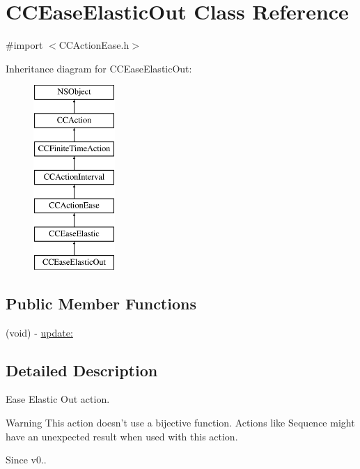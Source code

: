\hypertarget{interface_c_c_ease_elastic_out}{\section{C\-C\-Ease\-Elastic\-Out Class Reference}
\label{interface_c_c_ease_elastic_out}
}


{\ttfamily \#import $<$C\-C\-Action\-Ease.\-h$>$}

Inheritance diagram for C\-C\-Ease\-Elastic\-Out\-:\begin{figure}[H]
\begin{center}
\leavevmode
\includegraphics[height=7.000000cm]{interface_c_c_ease_elastic_out}
\end{center}
\end{figure}
\subsection*{Public Member Functions}
\begin{DoxyCompactItemize}
\item 
(void) -\/ \hyperlink{interface_c_c_ease_elastic_out_a069b3fce533cd8ef4cfd5e7be3e805cb}{update\-:}
\end{DoxyCompactItemize}


\subsection{Detailed Description}
Ease Elastic Out action. \begin{DoxyWarning}{Warning}
This action doesn't use a bijective function. Actions like Sequence might have an unexpected result when used with this action. 
\end{DoxyWarning}
\begin{DoxySince}{Since}
v0.. 
\end{DoxySince}


